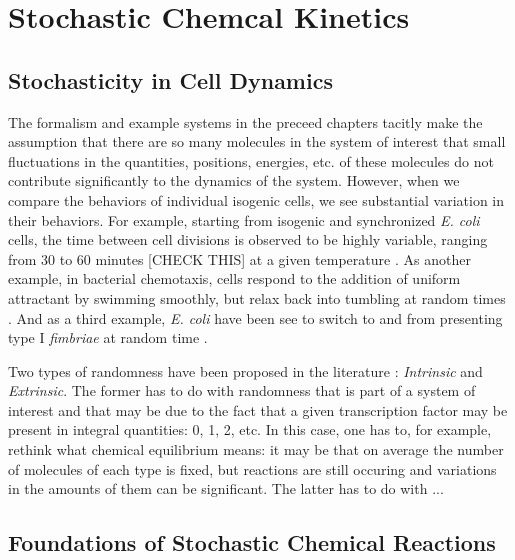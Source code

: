 \chapter{Stochastic Chemcal Kinetics} \label{ch:cme}

\section{Stochasticity in Cell Dynamics}

The formalism and example systems in the preceed chapters tacitly make
the assumption that there are so many molecules in the system of
interest that small fluctuations in the quantities, positions,
energies, etc. of these molecules do not contribute significantly to
the dynamics of the system. However, when we compare the behaviors of
individual isogenic cells, we see substantial variation in their
behaviors. For example, starting from isogenic and synchronized {\em
  E. coli} cells, the time between cell divisions is observed to be
highly variable, ranging from 30 to 60 minutes [CHECK THIS] at a given
temperature \cite{plank-harvey}. As another example, in bacterial
chemotaxis, cells respond to the addition of uniform attractant by
swimming smoothly, but relax back into tumbling at random times
\cite{spudich-koshland}. And as a third example, {\em E. coli} have
been see to switch to and from presenting type I {\em fimbriae} at
random time \cite{galley-fim}.

Two types of randomness have been proposed in the literature
\cite{swain-in-ex}: {\em Intrinsic} and {\em Extrinsic}. The former
has to do with randomness that is part of a system of interest and
that may be due to the fact that a given transcription factor may be
present in integral quantities: 0, 1, 2, etc. In this case, one has
to, for example, rethink what chemical equilibrium means: it may be
that on average the number of molecules of each type is fixed, but
reactions are still occuring and variations in the amounts of them can
be significant. The latter has to do with ...


\section{Foundations of Stochastic Chemical Reactions}

